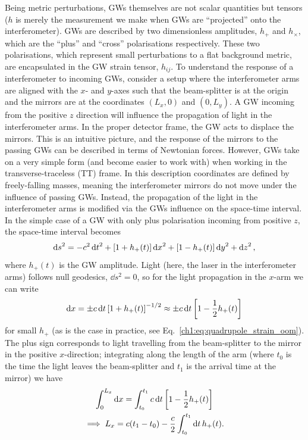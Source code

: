Being metric perturbations, GWs themselves are not scalar quantities but tensors ($h$ is merely the measurement we make when GWs are ``projected'' onto the interferometer).
GWs are described by two dimensionless amplitudes, $h_+$ and $h_\times$, which are the ``plus'' and ``cross'' polarisations respectively.
These two polarisations, which represent small perturbations to a flat background metric, are encapsulated in the GW strain tensor, $h_{ij}$.
To understand the response of a interferometer to incoming GWs, consider a setup where the interferometer arms are aligned with the $x$- and $y$-axes such that the beam-splitter is at the origin and the mirrors are at the coordinates $(L_x,0)$ and $(0,L_y)$. 
A GW incoming from the positive $z$ direction will influence the propagation of light in the interferometer arms. 
In the proper detector frame, the GW acts to displace the mirrors. 
This is an intuitive picture, and the response of the mirrors to the passing GWs can be described in terms of Newtonian forces. 
However, GWs take on a very simple form (and become easier to work with) when working in the transverse-traceless (TT) frame.
In this description coordinates are defined by freely-falling masses, meaning the interferometer mirrors do not move under the influence of passing GWs. 
Instead, the propagation of the light in the interferometer arms is modified via the GWs influence on the space-time interval.
In the simple case of a GW with only plus polarisation incoming from positive $z$, the space-time interval becomes
\begin{equation}
    \dd{s}^2 = -c^2 \dd{t}^2 + \qty[1 + h_+(t)] \dd{x}^2 + \qty[1 - h_+(t)] \dd{y}^2 + \dd{z}^2,
\end{equation}
where $h_+(t)$ is the GW amplitude.
Light (here, the laser in the interferometer arms) follows null geodesics, $\dd{s}^2 = 0$, so for the light propagation in the $x$-arm we can write
\begin{equation}
    \dd{x} = \pm c\dd{t} \qty[1 + h_+(t)]^{-1/2} \approx \pm c\dd{t} \qty[1 - \frac{1}{2} h_+(t)]
\end{equation}
for small $h_+$ (as is the case in practice, see Eq.~\ref{ch1:eq:quadrupole_strain_oom}).
The plus sign corresponds to light travelling from the beam-splitter to the mirror in the positive $x$-direction; integrating along the length of the arm (where $t_0$ is the time the light leaves the beam-splitter and $t_1$ is the arrival time at the mirror) we have
\begin{gather}
    \int_0^{L_x} \dd{x} = \int_{t_0}^{t_1} c\dd{t} \qty[1 - \frac{1}{2} h_+(t)] \\
    \implies L_x = c(t_1 - t_0) - \frac{c}{2} \int_{t_0}^{t_1} \dd{t} h_+(t). \label{ch1:eq:lx_outward}
\end{gather}
